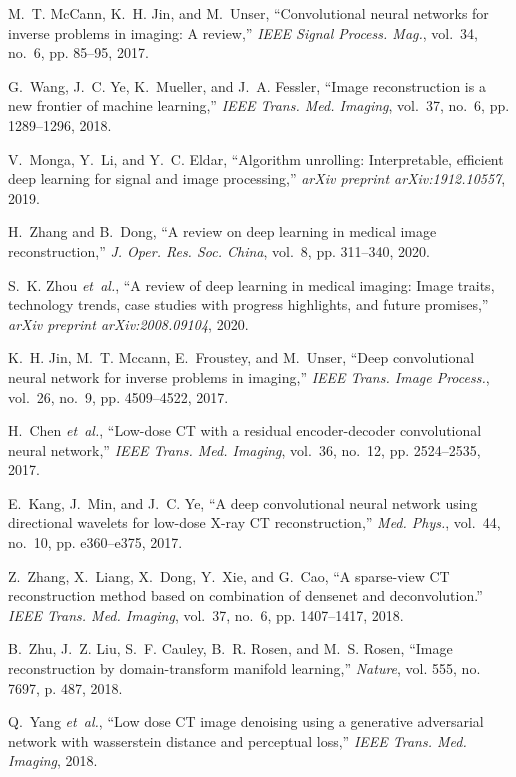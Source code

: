 \documentclass[journal,twoside]{IEEEtran}
\begin{document}
\begin{thebibliography}{10}
M.~T. McCann, K.~H. Jin, and M.~Unser, ``Convolutional neural networks for
  inverse problems in imaging: A review,'' \emph{IEEE Signal Process. Mag.},
  vol.~34, no.~6, pp. 85--95, 2017.

G.~Wang, J.~C. Ye, K.~Mueller, and J.~A. Fessler, ``Image reconstruction is a
  new frontier of machine learning,'' \emph{IEEE Trans. Med. Imaging}, vol.~37,
  no.~6, pp. 1289--1296, 2018.

V.~Monga, Y.~Li, and Y.~C. Eldar, ``Algorithm unrolling: Interpretable,
  efficient deep learning for signal and image processing,'' \emph{arXiv
  preprint arXiv:1912.10557}, 2019.

H.~Zhang and B.~Dong, ``A review on deep learning in medical image
  reconstruction,'' \emph{J. Oper. Res. Soc. China}, vol.~8, pp. 311--340,
  2020.

S.~K. Zhou \emph{et~al.}, ``A review of deep learning in medical imaging: Image
  traits, technology trends, case studies with progress highlights, and future
  promises,'' \emph{arXiv preprint arXiv:2008.09104}, 2020.

K.~H. Jin, M.~T. Mccann, E.~Froustey, and M.~Unser, ``Deep convolutional neural
  network for inverse problems in imaging,'' \emph{IEEE Trans. Image Process.},
  vol.~26, no.~9, pp. 4509--4522, 2017.

H.~Chen \emph{et~al.}, ``Low-dose {CT} with a residual encoder-decoder
  convolutional neural network,'' \emph{IEEE Trans. Med. Imaging}, vol.~36,
  no.~12, pp. 2524--2535, 2017.

E.~Kang, J.~Min, and J.~C. Ye, ``A deep convolutional neural network using
  directional wavelets for low-dose {X-ray CT} reconstruction,'' \emph{Med.
  Phys.}, vol.~44, no.~10, pp. e360--e375, 2017.

Z.~Zhang, X.~Liang, X.~Dong, Y.~Xie, and G.~Cao, ``A sparse-view {CT}
  reconstruction method based on combination of densenet and deconvolution.''
  \emph{IEEE Trans. Med. Imaging}, vol.~37, no.~6, pp. 1407--1417, 2018.

B.~Zhu, J.~Z. Liu, S.~F. Cauley, B.~R. Rosen, and M.~S. Rosen, ``Image
  reconstruction by domain-transform manifold learning,'' \emph{Nature}, vol.
  555, no. 7697, p. 487, 2018.

Q.~Yang \emph{et~al.}, ``Low dose {CT} image denoising using a generative
  adversarial network with wasserstein distance and perceptual loss,''
  \emph{IEEE Trans. Med. Imaging}, 2018.


\end{thebibliography}
\end{document}
